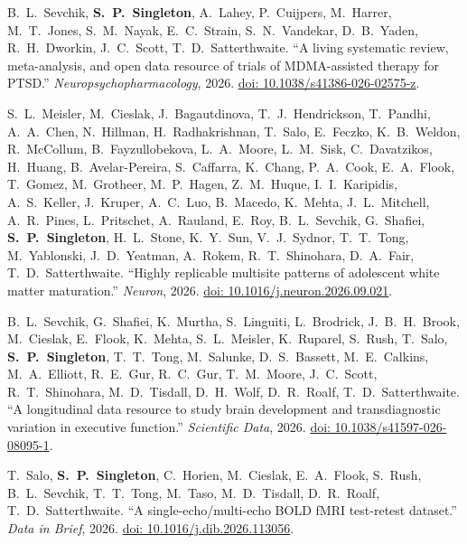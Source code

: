 \documentclass[11pt, letterpaper]{article}
\newcommand{\me}{\textbf{S.\ P.\ Singleton}}
\begin{document}
\begin{etaremune}[itemsep=5pt]
  \item B.\ L.\ Sevchik, \me, A.\ Lahey, P.\ Cuijpers, M.\ Harrer, M.\ T.\ Jones, S.\ M.\ Nayak, E.\ C.\ Strain, S.\ N.\ Vandekar, D.\ B.\ Yaden, R.\ H.\ Dworkin, J.\ C.\ Scott, T.\ D.\ Satterthwaite.
    ``A living systematic review, meta-analysis, and open data resource of trials of MDMA-assisted therapy for PTSD.''
    \textit{Neuropsychopharmacology}, 2026.
    \href{https://doi.org/10.1038/s41386-026-02575-z}{doi: 10.1038/s41386-026-02575-z}.

  \item S.\ L.\ Meisler, M.\ Cieslak, J.\ Bagautdinova, T.\ J.\ Hendrickson, T.\ Pandhi, A.\ A.\ Chen, N.\ Hillman, H.\ Radhakrishnan, T.\ Salo, E.\ Feczko, K.\ B.\ Weldon, R.\ McCollum, B.\ Fayzullobekova, L.\ A.\ Moore, L.\ M.\ Sisk, C.\ Davatzikos, H.\ Huang, B.\ Avelar-Pereira, S.\ Caffarra, K.\ Chang, P.\ A.\ Cook, E.\ A.\ Flook, T.\ Gomez, M.\ Grotheer, M.\ P.\ Hagen, Z.\ M.\ Huque, I.\ I.\ Karipidis, A.\ S.\ Keller, J.\ Kruper, A.\ C.\ Luo, B.\ Macedo, K.\ Mehta, J.\ L.\ Mitchell, A.\ R.\ Pines, L.\ Pritschet, A.\ Rauland, E.\ Roy, B.\ L.\ Sevchik, G.\ Shafiei, \me, H.\ L.\ Stone, K.\ Y.\ Sun, V.\ J.\ Sydnor, T.\ T.\ Tong, M.\ Yablonski, J.\ D.\ Yeatman, A.\ Rokem, R.\ T.\ Shinohara, D.\ A.\ Fair, T.\ D.\ Satterthwaite.
    ``Highly replicable multisite patterns of adolescent white matter maturation.''
    \textit{Neuron}, 2026.
    \href{https://doi.org/10.1016/j.neuron.2026.09.021}{doi: 10.1016/j.neuron.2026.09.021}.

  \item B.\ L.\ Sevchik, G.\ Shafiei, K.\ Murtha, S.\ Linguiti, L.\ Brodrick, J.\ B.\ H.\ Brook, M.\ Cieslak, E.\ Flook, K.\ Mehta, S.\ L.\ Meisler, K.\ Ruparel, S.\ Rush, T.\ Salo, \me, T.\ T.\ Tong, M.\ Salunke, D.\ S.\ Bassett, M.\ E.\ Calkins, M.\ A.\ Elliott, R.\ E.\ Gur, R.\ C.\ Gur, T.\ M.\ Moore, J.\ C.\ Scott, R.\ T.\ Shinohara, M.\ D.\ Tisdall, D.\ H.\ Wolf, D.\ R.\ Roalf, T.\ D.\ Satterthwaite.
    ``A longitudinal data resource to study brain development and transdiagnostic variation in executive function.''
    \textit{Scientific Data}, 2026.
    \href{https://doi.org/10.1038/s41597-026-08095-1}{doi: 10.1038/s41597-026-08095-1}.

  \item T.\ Salo, \me, C.\ Horien, M.\ Cieslak, E.\ A.\ Flook, S.\ Rush, B.\ L.\ Sevchik, T.\ T.\ Tong, M.\ Taso, M.\ D.\ Tisdall, D.\ R.\ Roalf, T.\ D.\ Satterthwaite.
    ``A single-echo/multi-echo BOLD fMRI test-retest dataset.''
    \textit{Data in Brief}, 2026.
    \href{https://doi.org/10.1016/j.dib.2026.113056}{doi: 10.1016/j.dib.2026.113056}.


\end{etaremune}
\end{document}
